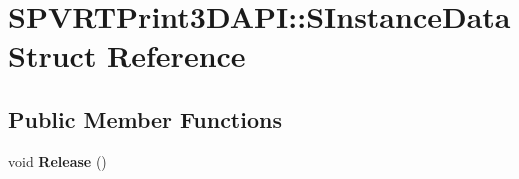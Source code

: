 \hypertarget{struct_s_p_v_r_t_print3_d_a_p_i_1_1_s_instance_data}{\section{S\+P\+V\+R\+T\+Print3\+D\+A\+P\+I\+:\+:S\+Instance\+Data Struct Reference}
\label{struct_s_p_v_r_t_print3_d_a_p_i_1_1_s_instance_data}
}
\subsection*{Public Member Functions}
\begin{DoxyCompactItemize}
\item 
\hypertarget{struct_s_p_v_r_t_print3_d_a_p_i_1_1_s_instance_data_abeeb8d1ceffaa1ba5dc00231fc345773}{void {\bfseries Release} ()}\label{struct_s_p_v_r_t_print3_d_a_p_i_1_1_s_instance_data_abeeb8d1ceffaa1ba5dc00231fc345773}

\end{DoxyCompactItemize}
